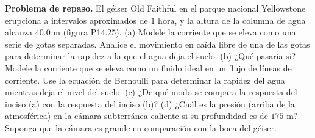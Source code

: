 \item \textbf{Problema de repaso.} El géiser Old Faithful en el parque nacional Yellowstone erupciona a intervalos aproximados de $1 \text{ hora}$, y la altura de la columna de agua alcanza $40.0 \text{ m}$ (figura P14.25). (a) Modele la corriente que se eleva como una serie de gotas separadas. Analice el movimiento en caída libre de una de las gotas para determinar la rapidez a la que el agua deja el suelo. (b) ¿Qué pasaría si? Modele la corriente que se eleva como un fluido ideal en un flujo de líneas de corriente. Use la ecuación de Bernoulli para determinar la rapidez del agua mientras deja el nivel del suelo. (c) ¿De qué modo se compara la respuesta del inciso (a) con la respuesta del inciso (b)? (d) ¿Cuál es la presión (arriba de la atmosférica) en la cámara subterránea caliente si su profundidad es de $175 \text{ m}$? Suponga que la cámara es grande en comparación con la boca del géiser.
